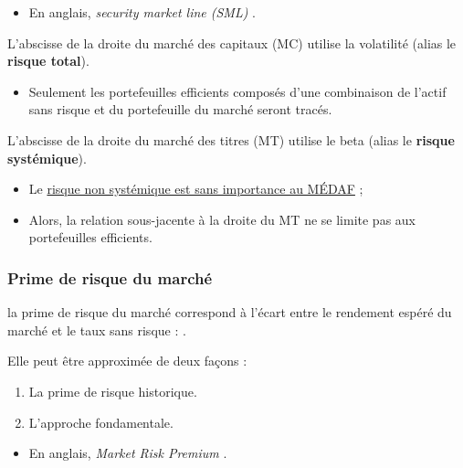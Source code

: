 \documentclass[10pt, french]{article}
\begin{document}
\begin{multicols*}{2}
\begin{definitionNOHFILLsub}
\begin{center}
\begin{tikzpicture}[x=0.75pt,y=0.75pt,yscale=-1,xscale=1]
\end{tikzpicture}
\end{center}

\begin{itemize}
	\item	En anglais, \og \textit{security market line (SML)} \fg{}.
\end{itemize}

\end{definitionNOHFILLsub}

\begin{rappel_enhanced}
L'abscisse de la droite du marché des capitaux (MC) utilise la volatilité (alias le \textbf{risque total}).
\begin{itemize}
	\item	Seulement les portefeuilles efficients composés d'une combinaison de l'actif sans risque et du portefeuille du marché seront tracés.
\end{itemize}

L'abscisse de la droite du marché des titres (MT) utilise le beta (alias le \textbf{risque systémique}).
\begin{itemize}
	\item	Le \underline{risque non systémique est sans importance au MÉDAF} ;
	\item	Alors, la relation sous-jacente à la droite du MT ne se limite pas aux portefeuilles efficients.
\end{itemize}
\end{rappel_enhanced}


\subsubsection{Prime de risque du marché}
\begin{definitionNOHFILLsub}
la prime de risque du marché correspond à l'écart entre le rendement espéré du marché et le taux sans risque : .

Elle peut être approximée de deux façons :
\begin{enumerate}
	\item	La prime de risque historique.
	\item	L'approche fondamentale.
\end{enumerate}

\begin{itemize}
	\item	En anglais, \og \textit{Market Risk Premium} \fg{}.
\end{itemize}
\end{definitionNOHFILLsub}



\end{multicols*}
\end{document}
